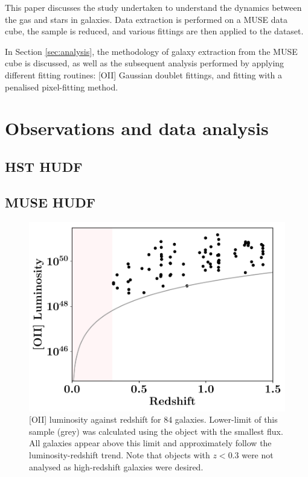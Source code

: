 \documentclass[12pt, twocolumn]{revtex4-1}    %
\begin{document}
This paper discusses the study undertaken to understand the dynamics between the gas and stars in galaxies. Data extraction is performed on a MUSE data cube, the sample is reduced, and various fittings are then applied to the dataset.

In Section \ref{sec:analysis}, the methodology of galaxy extraction from the MUSE cube is discussed, as well as the subsequent analysis performed by applying different fitting routines: [OII] Gaussian doublet fittings, and fitting with a penalised pixel-fitting method. 

\section{Observations and data analysis}

\subsection{HST HUDF}

\subsection{MUSE HUDF}
\noindent

\begin{figure}
\includegraphics[width=1.0\linewidth]{data/o_ii_luminosity_vs_redshift}
\caption{[OII] luminosity against redshift for 84 galaxies. Lower-limit of this sample (grey) was calculated using the object with the smallest flux. All galaxies appear above this limit and approximately follow the luminosity-redshift trend. Note that objects with $z<0.3$ were not analysed as high-redshift galaxies were desired. }
\label{fig:oiiluminosity_redshift}
\end{figure} 
\end{document}
